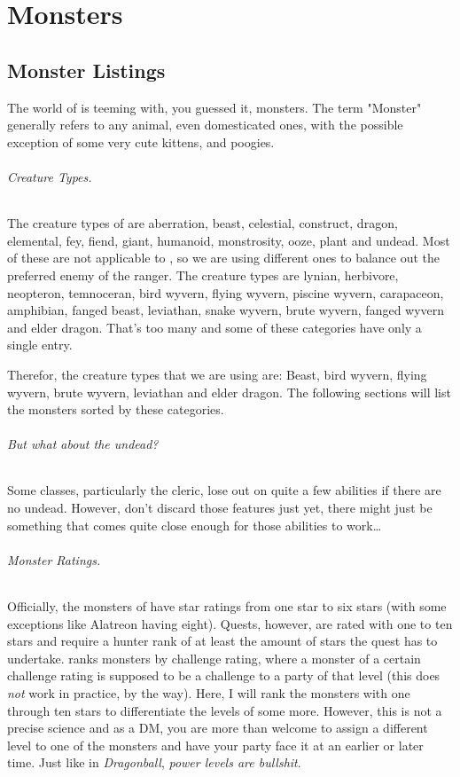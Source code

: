 \renewcommand*{\hbPartCover}{assets/ext/lagiacrus}
\renewcommand*{\hbPartSubcover}{assets/ext/lagiacrus2}
\part{Monsters}


\chapter{Monster Listings}
The world of \MH{} is teeming with, you guessed it, monsters. The term "Monster" generally refers to any animal, even domesticated ones, with the possible exception of some very cute kittens, and poogies.

\paragraph{Creature Types.} The creature types of \DND{} are aberration, beast, celestial, construct, dragon, elemental, fey, fiend, giant, humanoid, monstrosity, ooze, plant and undead. Most of these are not applicable to \MH{}, so we are using different ones to balance out the preferred enemy of the ranger. The \MH{} creature types are lynian, herbivore, neopteron, temnoceran, bird wyvern, flying wyvern, piscine wyvern, carapaceon, amphibian, fanged beast, leviathan, snake wyvern, brute wyvern, fanged wyvern and elder dragon. That's too many and some of these categories have only a single entry.

Therefor, the creature types that we are using are: Beast, bird wyvern, flying wyvern, brute wyvern, leviathan and elder dragon. The following sections will list the monsters sorted by these categories.

\paragraph{But what about the undead?} Some classes, particularly the cleric, lose out on quite a few abilities if there are no undead. However, don't discard those features just yet, there might just be something that comes quite close enough for those abilities to work\ldots

\paragraph{Monster Ratings.} Officially, the monsters of \MH{} have star ratings from one star to six stars (with some exceptions like Alatreon having eight). Quests, however, are rated with one to ten stars and require a hunter rank of at least the amount of stars the quest has to undertake. \DND{} ranks monsters by challenge rating, where a monster of a certain challenge rating is supposed to be a challenge to a party of that level (this does \emph{not} work in practice, by the way). Here, I will rank the monsters with one through ten stars to differentiate the levels of \MH{} some more. However, this is not a precise science and as a DM, you are more than welcome to assign a different level to one of the monsters and have your party face it at an earlier or later time. Just like in \emph{Dragonball}, \emph{power levels are bullshit}.

